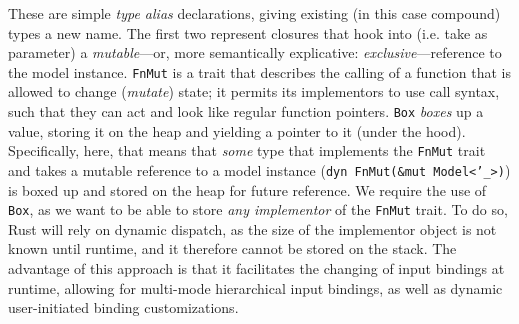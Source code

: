 These  are   simple  \textit{type  alias}  declarations,   giving  existing  (in
this  case  compound)  types  a  new name.  The  first  two  represent  closures
that   hook   into   (i.e.   take   as   parameter)   a   \textit{mutable}---or,
more  semantically  explicative:  \textit{exclusive}---reference  to  the  model
instance\cite{therustbook}. \texttt{FnMut}  is a trait  that describes
the calling of a function that  is allowed to change (\textit{mutate}) state; it
permits  its  implementors to  use  call  syntax, such  that  they  can act  and
look like  regular function  pointers. \texttt{Box}  \textit{boxes} up
a  value,  storing  it  on  the  heap  and  yielding  a  pointer  to  it  (under
the  hood).  Specifically,  here,  that   means  that  \textit{some}  type  that
implements  the \texttt{FnMut}  trait  and takes  a mutable  reference
to  a model  instance  (\texttt{dyn FnMut(&mut  Model<'_>)}) is  boxed
up  and  stored  on the  heap  for  future  reference.  We require  the  use  of
\texttt{Box}, as we want to  be able to store \textit{any implementor}
of  the \texttt{FnMut}  trait. To  do so,  Rust will  rely on  dynamic
dispatch, as the size of the implementor  object is not known until runtime, and
it therefore cannot be stored on the stack\cite{rustclosureshard}. The advantage
of  this approach  is that  it  facilitates the  changing of  input bindings  at
runtime, allowing for multi-mode hierarchical input bindings, as well as dynamic
user-initiated binding customizations.

